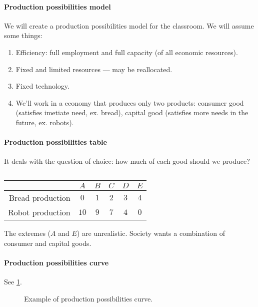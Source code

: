 \paragraph{Production possibilities model}
We will create a production possibilities model for the classroom. We will assume some things:
\begin{enumerate}[label = \textbullet]
	\item Efficiency: full employment and full capacity (of all economic resources).
	\item Fixed and limited resources --- may be reallocated.
	\item Fixed technology.
	\item We'll work in a economy that produces only two products: consumer good (satisfies imetiate need, ex. bread), capital good (satisfies more needs in the future, ex. robots).
\end{enumerate}

\paragraph{Production possibilities table} It deals with the question of choice: how much of each good should we produce?

\begin{table}[ht]
	\centering
	\begin{tabular}{rccccc} \toprule
						 & $A$  & $B$ & $C$ & $D$ & $E$ \\ \midrule
		Bread production & $0$  & $1$ & $2$ & $3$ & $4$ \\
		Robot production & $10$ & $9$ & $7$ & $4$ & $0$ \\ \bottomrule
	\end{tabular}
	\caption{}
\end{table}

The extremes ($A$ and $E$) are unrealistic. Society wants a combination of consumer and capital goods.

\paragraph{Production possibilities curve} See \cref{fig:breadvsrobots}.

\begin{figure}[ht]
	\centering
	\caption{Example of production possibilities curve.}
	\label{fig:breadvsrobots}
\end{figure}


